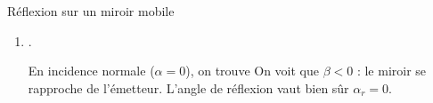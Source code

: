 \begin{exo}[PC][1][TD]{Réflexion sur un miroir mobile}
\begin{quest}
{\begin{enumerate}
  La fréquence vaut alors 
$ \nu_r = \gamma^2 \nu (1 - \beta \cos \alpha')(1-\beta \cos \alpha) = \nu \gamma^2 (1 - 2\beta \cos \alpha +\beta^2)$, soit 
L'angle de réflexion s'obtient par 
  \item {}. 
  
  En incidence normale ($\alpha=0$), on trouve 
    On voit que $\beta < 0$ : le miroir se rapproche de l'émetteur. L'angle de réflexion vaut bien sûr $\alpha_r = 0$.
  \end{enumerate}
  }
  \end{quest}
\end{exo}


